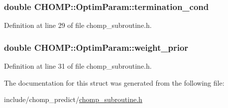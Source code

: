 \subsubsection[{\texorpdfstring{termination\+\_\+cond}{termination_cond}}]{\setlength{\rightskip}{0pt plus 5cm}double C\+H\+O\+M\+P\+::\+Optim\+Param\+::termination\+\_\+cond}\hypertarget{struct_c_h_o_m_p_1_1_optim_param_afb3b23647f1698f1815f4f877ac302ea}{}\label{struct_c_h_o_m_p_1_1_optim_param_afb3b23647f1698f1815f4f877ac302ea}


Definition at line 29 of file chomp\+\_\+subroutine.\+h.

\subsubsection[{\texorpdfstring{weight\+\_\+prior}{weight_prior}}]{\setlength{\rightskip}{0pt plus 5cm}double C\+H\+O\+M\+P\+::\+Optim\+Param\+::weight\+\_\+prior}\hypertarget{struct_c_h_o_m_p_1_1_optim_param_a7dc4e45cd704217867a399e656af6b87}{}\label{struct_c_h_o_m_p_1_1_optim_param_a7dc4e45cd704217867a399e656af6b87}


Definition at line 31 of file chomp\+\_\+subroutine.\+h.



The documentation for this struct was generated from the following file\+:\begin{DoxyCompactItemize}
\item 
include/chomp\+\_\+predict/\hyperlink{chomp__subroutine_8h}{chomp\+\_\+subroutine.\+h}\end{DoxyCompactItemize}
